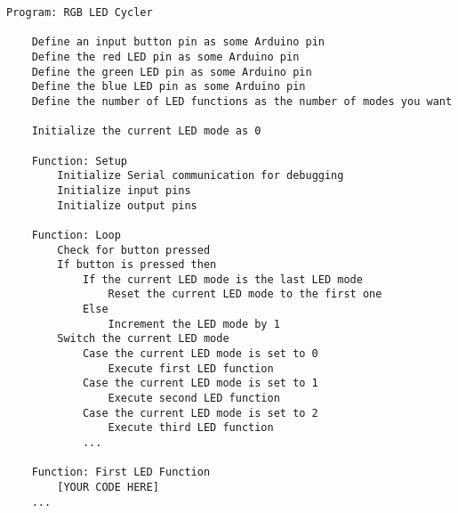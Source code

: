 \begin{lstlisting}[linewidth=1.5\textwidth]
    Program: RGB LED Cycler

    Define an input button pin as some Arduino pin
    Define the red LED pin as some Arduino pin
    Define the green LED pin as some Arduino pin
    Define the blue LED pin as some Arduino pin
    Define the number of LED functions as the number of modes you want

    Initialize the current LED mode as 0

    Function: Setup
        Initialize Serial communication for debugging
        Initialize input pins
        Initialize output pins

    Function: Loop
        Check for button pressed
        If button is pressed then
            If the current LED mode is the last LED mode
                Reset the current LED mode to the first one
            Else
                Increment the LED mode by 1
        Switch the current LED mode
            Case the current LED mode is set to 0
                Execute first LED function
            Case the current LED mode is set to 1
                Execute second LED function
            Case the current LED mode is set to 2
                Execute third LED function
            ...
    
    Function: First LED Function
        [YOUR CODE HERE]
    ...

\end{lstlisting}

